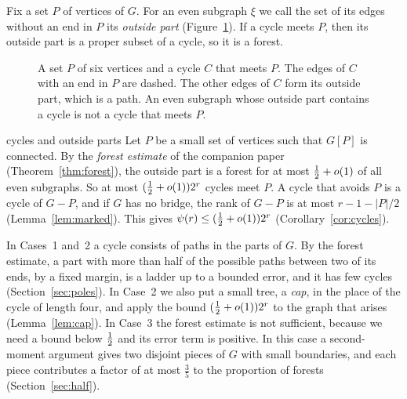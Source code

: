 Fix a set $P$ of vertices of $G$. For an even subgraph $\xi$ we call the set of its edges without
an end in $P$ its \emph{outside part} (Figure~\ref{fig:outside}). If a cycle meets $P$, then its
outside part is a proper subset of a cycle, so it is a forest.

\begin{figure}[ht]
\centering
{}
\caption{A set $P$ of six vertices and a cycle $C$ that meets $P$. The edges of $C$ with an end
in $P$ are dashed. The other edges of $C$ form its outside part, which is a path. An even
subgraph whose outside part contains a cycle is not a cycle that meets $P$.}
\label{fig:outside}
\end{figure}

\begin{idea}{cycles and outside parts}
Let $P$ be a small set of vertices such that $G[P]$ is connected. By the \emph{forest estimate}
of the companion paper~\cite{Forest} (Theorem~\ref{thm:forest}), the outside part is a forest for
at most $\tfrac12+o(1)$ of all even subgraphs. So at most $(\tfrac12+o(1))2^{r}$ cycles meet $P$. A cycle that avoids $P$ is a cycle of
$G-P$, and if $G$ has no bridge, the rank of $G-P$ is at most $r-1-|P|/2$
(Lemma~\ref{lem:marked}). This gives $\psi(r)\le(\tfrac12+o(1))2^{r}$ (Corollary~\ref{cor:cycles}).
\end{idea}

In Cases~1 and~2 a cycle consists of paths in the parts of $G$. By the forest estimate,
a part with more than half of the possible paths between two of its ends, by a fixed margin, is a
ladder up to a bounded error, and it has few cycles (Section~\ref{sec:poles}). In Case~2 we
also put a small tree, a \emph{cap}, in the place of the cycle of length four, and apply the
bound $(\tfrac12+o(1))2^{r}$ to the graph that arises (Lemma~\ref{lem:cap}). In Case~3 the
forest estimate is not sufficient, because we need a bound below $\tfrac12$ and its error term is
positive. In this case a second-moment argument gives two disjoint pieces of $G$ with small
boundaries, and each piece contributes a factor of at most $\frac35$ to the proportion of
forests (Section~\ref{sec:half}).

